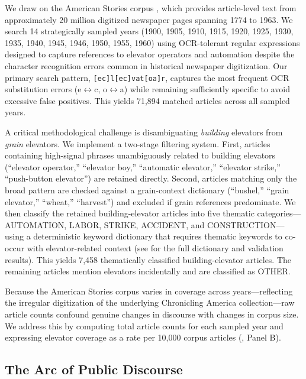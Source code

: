 \documentclass[12pt]{article}
\begin{document}
We draw on the American Stories corpus \citep{dell2023}, which provides article-level text from approximately 20 million digitized newspaper pages spanning 1774 to 1963. We search 14 strategically sampled years (1900, 1905, 1910, 1915, 1920, 1925, 1930, 1935, 1940, 1945, 1946, 1950, 1955, 1960) using OCR-tolerant regular expressions designed to capture references to elevator operators and automation despite the character recognition errors common in historical newspaper digitization. Our primary search pattern, \texttt{[ec]l[ec]vat[oa]r}, captures the most frequent OCR substitution errors (e$\leftrightarrow$c, o$\leftrightarrow$a) while remaining sufficiently specific to avoid excessive false positives. This yields 71,894 matched articles across all sampled years.

A critical methodological challenge is disambiguating \emph{building} elevators from \emph{grain} elevators. We implement a two-stage filtering system. First, articles containing high-signal phrases unambiguously related to building elevators (``elevator operator,'' ``elevator boy,'' ``automatic elevator,'' ``elevator strike,'' ``push-button elevator'') are retained directly. Second, articles matching only the broad pattern are checked against a grain-context dictionary (``bushel,'' ``grain elevator,'' ``wheat,'' ``harvest'') and excluded if grain references predominate. We then classify the retained building-elevator articles into five thematic categories---AUTOMATION, LABOR, STRIKE, ACCIDENT, and CONSTRUCTION---using a deterministic keyword dictionary that requires thematic keywords to co-occur with elevator-related context (see  for the full dictionary and validation results). This yields 7,458 thematically classified building-elevator articles. The remaining articles mention elevators incidentally and are classified as OTHER.

Because the American Stories corpus varies in coverage across years---reflecting the irregular digitization of the underlying Chronicling America collection---raw article counts confound genuine changes in discourse with changes in corpus size. We address this by computing total article counts for each sampled year and expressing elevator coverage as a rate per 10,000 corpus articles (, Panel B).

\subsection{The Arc of Public Discourse}
\end{document}
